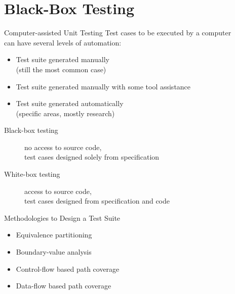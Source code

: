 \section{Black-Box Testing}


\begin{Frame}{Computer-assisted Unit Testing}
  Test cases to be executed by a computer\\
  can have several levels of automation:

  \begin{itemize}
    \item Test suite generated \alert{manually}\\
      (still the most common case)
    \item Test suite generated \alert{manually with some tool assistance }
    \item Test suite generated \alert{automatically}\\
      (specific areas, mostly research)
  \end{itemize}
  
  \xxx

  \begin{description}
    \item[Black-box testing] \alert{no access} to source code,\\
      test cases designed solely \alert{from specification}
    \item[White-box testing] \alert{access} to source code,\\
      test cases designed \alert{from specification and code}
  \end{description}
\end{Frame}

\begin{Frame}{Methodologies to Design a Test Suite}

  \begin{itemize}
    \item Equivalence partitioning
    \item Boundary-value analysis
  \end{itemize}

  \xxx


  \begin{itemize}
    \item Control-flow based path coverage
    \item Data-flow based path coverage
  \end{itemize}
\end{Frame}

